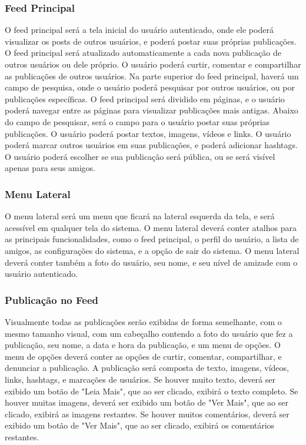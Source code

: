 \documentclass[../main.tex]{subfiles}
\begin{document}
\subsubsection{Feed Principal}
O feed principal será a tela inicial do usuário autenticado, onde ele poderá visualizar
os posts de outros usuários, e poderá postar suas próprias publicações. O feed principal
será atualizado automaticamente a cada nova publicação de outros usuários ou dele próprio. 
O usuário poderá curtir, comentar e compartilhar as publicações de outros usuários. Na 
parte superior do feed principal, haverá um campo de pesquisa, onde o usuário poderá
pesquisar por outros usuários, ou por publicações específicas. O feed principal será
dividido em páginas, e o usuário poderá navegar entre as páginas para visualizar publicações
mais antigas. Abaixo do campo de pesquisar, será o campo para o usuário postar suas
próprias publicações. O usuário poderá postar textos, imagens, vídeos e links. O usuário
poderá marcar outros usuários em suas publicações, e poderá adicionar hashtags. O usuário
poderá escolher se sua publicação será pública, ou se será visível apenas para seus amigos.
\subsubsection{Menu Lateral}
O menu lateral será um menu que ficará na lateral esquerda da tela, e será acessível em
qualquer tela do sistema. O menu lateral deverá conter atalhos para as principais 
funcionalidades, como o feed principal, o perfil do usuário, a lista de amigos, as
configurações do sistema, e a opção de sair do sistema. O menu lateral deverá conter
também a foto do usuário, seu nome, e seu nível de amizade com o usuário autenticado.
\subsubsection{Publicação no Feed}
Visualmente todas as publicações serão exibidas de forma semelhante, com o mesmo 
tamanho visual, com um cabeçalho contendo a foto do usuário que fez a publicação,
seu nome, a data e hora da publicação, e um menu de opções. O menu de opções
deverá conter as opções de curtir, comentar, compartilhar, e denunciar a publicação. 
A publicação será composta de texto, imagens, vídeos, links, hashtags, e marcações de
usuários. Se houver muito texto, deverá ser exibido um botão de "Leia Mais", que
ao ser clicado, exibirá o texto completo. Se houver muitas imagens, deverá ser exibido
um botão de "Ver Mais", que ao ser clicado, exibirá as imagens restantes. Se houver
muitos comentários, deverá ser exibido um botão de "Ver Mais", que ao ser clicado,
exibirá os comentários restantes.
\end{document}
